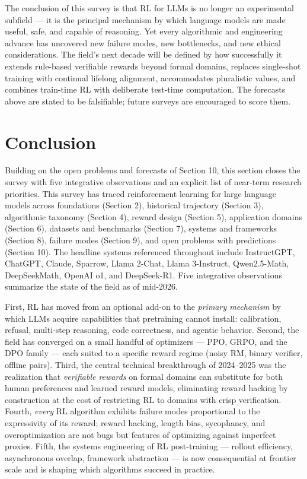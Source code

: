 \documentclass{article}
\begin{document}
The conclusion of this survey is that RL for LLMs is no longer an experimental subfield --- it is the principal mechanism by which language models are made useful, safe, and capable of reasoning. Yet every algorithmic and engineering advance has uncovered new failure modes, new bottlenecks, and new ethical considerations. The field's next decade will be defined by how successfully it extends rule-based verifiable rewards beyond formal domains, replaces single-shot training with continual lifelong alignment, accommodates pluralistic values, and combines train-time RL with deliberate test-time computation. The forecasts above are stated to be falsifiable; future surveys are encouraged to score them.

\section{Conclusion}\label{conclusion}

Building on the open problems and forecasts of Section 10, this section closes the survey with five integrative observations and an explicit list of near-term research priorities. This survey has traced reinforcement learning for large language models across foundations (Section 2), historical trajectory (Section 3), algorithmic taxonomy (Section 4), reward design (Section 5), application domains (Section 6), datasets and benchmarks (Section 7), systems and frameworks (Section 8), failure modes (Section 9), and open problems with predictions (Section 10). The headline systems referenced throughout include InstructGPT, ChatGPT, Claude, Sparrow, Llama 2-Chat, Llama 3-Instruct, Qwen2.5-Math, DeepSeekMath, OpenAI o1, and DeepSeek-R1. Five integrative observations summarize the state of the field as of mid-2026.

First, RL has moved from an optional add-on to the \emph{primary mechanism} by which LLMs acquire capabilities that pretraining cannot install: calibration, refusal, multi-step reasoning, code correctness, and agentic behavior. Second, the field has converged on a small handful of optimizers --- PPO, GRPO, and the DPO family --- each suited to a specific reward regime (noisy RM, binary verifier, offline pairs). Third, the central technical breakthrough of 2024--2025 was the realization that \emph{verifiable rewards} on formal domains can substitute for both human preferences and learned reward models, eliminating reward hacking by construction at the cost of restricting RL to domains with crisp verification. Fourth, \emph{every} RL algorithm exhibits failure modes proportional to the expressivity of its reward; reward hacking, length bias, sycophancy, and overoptimization are not bugs but features of optimizing against imperfect proxies. Fifth, the systems engineering of RL post-training --- rollout efficiency, asynchronous overlap, framework abstraction --- is now consequential at frontier scale and is shaping which algorithms succeed in practice.
\end{document}
